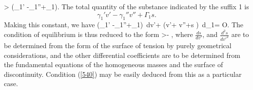 \documentclass[12pt]{article}
\begin{document}
{\eqs \sigma {}> \left(\gamma_1' -\gamma_1''+\Gamma_1\right). \label{545}\eqe
The total quantity of the substance indicated by the suffix 1 is
$$\gamma_1' v'-\gamma_1''v''+\Gamma_1 s.$$
Making this constant, we have
\eqs
\left(\gamma_1' -\gamma_1''+\Gamma_1\right)\, dv'+ 
\left(v'+ v''+s \right)\, d\mu_1= O. \label{546}\eqe
The condition of equilibrium is thus reduced to the form
\eqs \sigma {}>- ,\label{547}\eqe
where $\frac{ds}{dv'}$, and $\frac{d^2s}{dv'^2}$ are to be determined from the form of the surface of tension by purely geometrical considerations, and the other differential coefficients are to be determined from the fundamental equations of the homogeneous masses and the surface of discontinuity. Condition (\ref{540}) may be easily deduced from this as a particular case.

}
\end{document}
